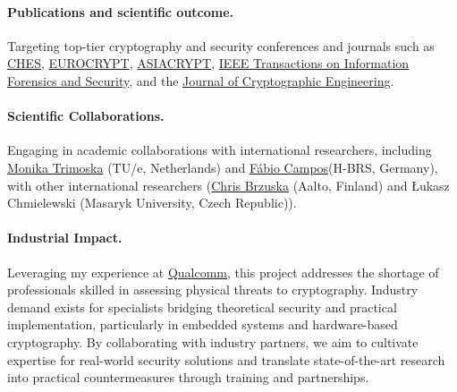 \documentclass[11pt, a4paper]{article}
\begin{document}
\paragraph{Publications and scientific outcome.} Targeting top-tier cryptography and security conferences and journals such as 
\href{https://ches.iacr.org/index.php}{CHES}, \href{https://eurocrypt.iacr.org/}{EUROCRYPT}, 
\href{https://asiacrypt.iacr.org/}{ASIACRYPT}, 
\href{https://ieeexplore.ieee.org/xpl/RecentIssue.jsp?punumber=10206}{IEEE Transactions on Information Forensics and Security}, 
and the \href{https://link.springer.com/journal/13389}{Journal of Cryptographic Engineering}. 

\paragraph{Scientific Collaborations.} Engaging in academic collaborations with international 
researchers, including \href{https://mtrimoska.com/}{Monika Trimoska} (TU/e, Netherlands) and
\href{https://www.sopmac.de/index.html}{Fábio Campos}(H-BRS, Germany), with other international researchers 
(\href{https://research.aalto.fi/en/persons/chris-brzuska}{Chris Brzuska} (Aalto, Finland) and Łukasz Chmielewski 
(Masaryk University, Czech Republic)). 



\paragraph{Industrial Impact.}
Leveraging my experience at \href{https://www.qualcomm.com/}{Qualcomm}, 
this project addresses the shortage of professionals skilled in 
assessing physical threats to cryptography. Industry demand exists 
for specialists bridging theoretical security and practical 
implementation, particularly in embedded systems and hardware-based 
cryptography. By collaborating with industry partners, we aim to 
cultivate expertise for real-world security solutions and translate 
state-of-the-art research into practical countermeasures through training 
and partnerships.
\end{document}

